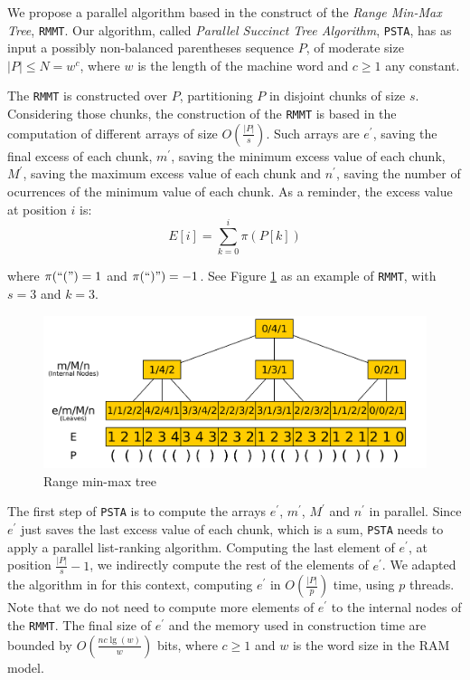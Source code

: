 We propose a parallel algorithm based in the construct of the \emph{Range Min-Max Tree}, {\tt RMMT}\cite{Navarro:2014:FFS:2620785.2601073}. Our algorithm, called \emph{Parallel Succinct Tree Algorithm}, {\tt PSTA}, has as input a possibly non-balanced parentheses sequence $P$, of moderate size $|P|\leq N = w^{c}$, where $w$ is the length of the machine word and $c\geq 1$ any constant.

The {\tt RMMT} is constructed over $P$, partitioning $P$ in disjoint chunks of size $s$. Considering those chunks, the construction of the {\tt RMMT} is based in the computation of different arrays of size $O(\frac{|P|}{s})$. Such arrays are $e^{\prime}$, saving the final excess of each chunk, $m^{\prime}$, saving the minimum excess value of each chunk, $M^{\prime}$, saving the maximum excess value of each chunk and $n^{\prime}$, saving the number of ocurrences of the minimum value of each chunk. As a reminder, the excess value at position $i$ is:
\begin{equation}
		\displaystyle E[i] = \sum_{k=0}^{i} \pi(P[k])
		\label{eq:excess}
\end{equation}

where $\pi(``(") = 1$ and $\pi(``)") = -1$. See Figure \ref{fig:RangeMinMaxTree} as an example of {\tt RMMT}, with $s=3$ and $k=3$.

 	\begin{figure}[ht]
		\centering
		\includegraphics[scale=0.13]{./images/Range-min-max-tree.png}
     	\caption{Range min-max tree}
		\label{fig:RangeMinMaxTree} 
	\end{figure}

The first step of {\tt PSTA} is to compute the arrays $e^{\prime}$, $m^{\prime}$, $M^{\prime}$ and $n^{\prime}$ in parallel. Since $e^{\prime}$ just saves the last excess value of each chunk, which is a sum, {\tt PSTA} needs to apply a parallel list-ranking algorithm. Computing the last element of $e^{\prime}$, at position $\frac{|P|}{s}-1$, we indirectly compute the rest of the elements of $e^{\prime}$. We adapted the algorithm in \cite{Helman2001265} for this context, computing $e^{\prime}$ in $O(\frac{|P|}{p})$ time, using $p$ threads. Note that we do not need to compute more elements of $e^{\prime}$ to the internal nodes of the {\tt RMMT}. The final size of $e^{\prime}$  and the memory used in construction time are bounded by $O(\frac{nc\lg(w)}{w})$ bits, where $c\geqslant 1$ and $w$ is the word size in the RAM model.

